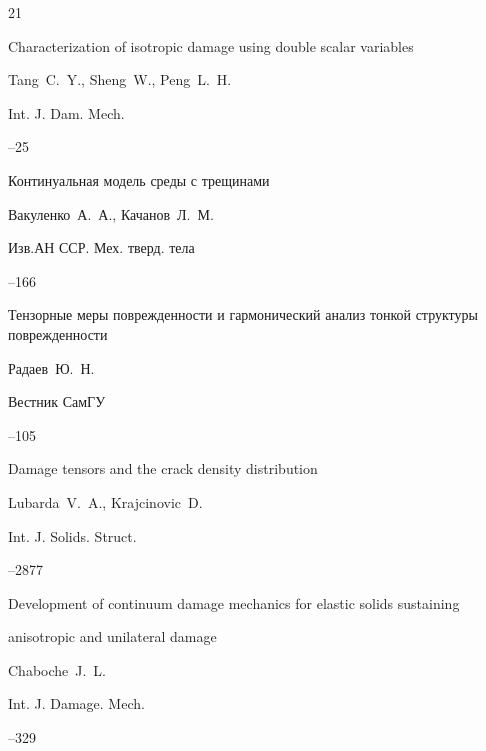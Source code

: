 \begin{thebibliography}{21}

\paper Characterization of isotropic damage using double scalar variables

\by Tang~C.~Y., Sheng~W., Peng~L.~H.

\jour Int. J. Dam. Mech.



--25




\paper  Континуальная модель среды с трещинами

\by Вакуленко~А.~А., Качанов~Л.~М.

\jour Изв.АН ССР. Мех. тверд. тела



--166




\paper Тензорные меры поврежденности и гармонический анализ тонкой структуры поврежденности

\by Радаев~Ю.~Н.

\jour Вестник СамГУ



--105




\paper Damage tensors and the crack density distribution

\by Lubarda~V.~A., Krajcinovic~D.

\jour Int. J. Solids. Struct.



--2877




\paper Development of continuum damage mechanics for elastic solids sustaining

anisotropic and unilateral damage

\by Chaboche~J.~L.

\jour Int. J. Damage. Mech.



--329




\end{thebibliography}
